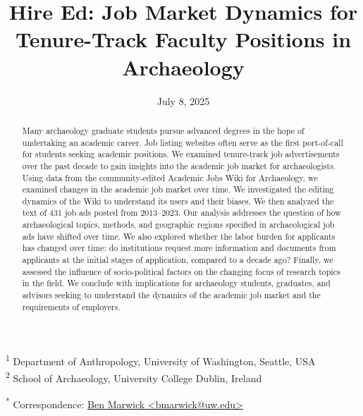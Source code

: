 \documentclass[
  12pt,
]{article}
\title{Hire Ed: Job Market Dynamics for Tenure-Track Faculty Positions
in Archaeology}
\author{}
\date{July 8, 2025}
\begin{document}
\maketitle
\begin{abstract}
Many archaeology graduate students pursue advanced degrees in the hope
of undertaking an academic career. Job listing websites often serve as
the first port-of-call for students seeking academic positions. We
examined tenure-track job advertisements over the past decade to gain
insights into the academic job market for archaeologists. Using data
from the community-edited Academic Jobs Wiki for Archaeology, we
examined changes in the academic job market over time. We investigated
the editing dynamics of the Wiki to understand its users and their
biases. We then analyzed the text of 431 job ads posted from 2013--2023.
Our analysis addresses the question of how archaeological topics,
methods, and geographic regions specified in archaeological job ads have
shifted over time. We also explored whether the labor burden for
applicants has changed over time: do institutions request more
information and documents from applicants at the initial stages of
application, compared to a decade ago? Finally, we assessed the
influence of socio-political factors on the changing focus of research
topics in the field. We conclude with implications for archaeology
students, graduates, and advisors seeking to understand the dynamics of
the academic job market and the requirements of employers.
\end{abstract}

\begin{titlepage}
    \centering
    {\huge\bfseries \thetitle\par}
    \vspace{2cm}
    {\Large \theauthor\par}
    \vspace{1cm}
    \theaffiliation
\end{titlepage}
\doublespacing

\textsuperscript{1} Department of Anthropology, University of
Washington, Seattle, USA\\
\textsuperscript{2} School of Archaeology, University College Dublin,
Ireland

\textsuperscript{*} Correspondence:
\href{mailto:bmarwick@uw.edu}{Ben Marwick
\textless{}bmarwick@uw.edu\textgreater{}}
\end{document}
